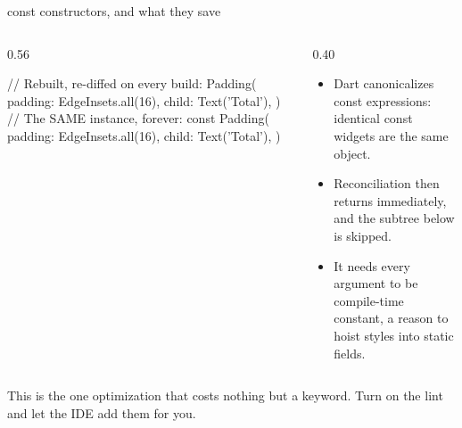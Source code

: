 \documentclass[10pt,aspectratio=169,t]{beamer}
\begin{document}
\begin{frame}[fragile,eyebrow=Optimization]{const constructors, and what they save}
  \begin{columns}[T]
    \begin{column}{0.56\textwidth}
\begin{dart}
// Rebuilt, re-diffed on every build:
Padding(
  padding: EdgeInsets.all(16),
  child: Text('Total'),
)
// The SAME instance, forever:
const Padding(
  padding: EdgeInsets.all(16),
  child: Text('Total'),
)
\end{dart}
    \end{column}
    \begin{column}{0.40\textwidth}
      \begin{itemize}
        \item Dart canonicalizes const expressions: identical const widgets are the same object.
        \item Reconciliation then returns immediately, and the subtree below is skipped.
        \item It needs every argument to be compile-time constant, a reason to hoist styles into static fields.
      \end{itemize}
    \end{column}
  \end{columns}
  \begin{takeaway}{This is the one optimization that costs nothing but a keyword.}
    Turn on the  lint and let the IDE add them for you.
  \end{takeaway}
\end{frame}
\end{document}
